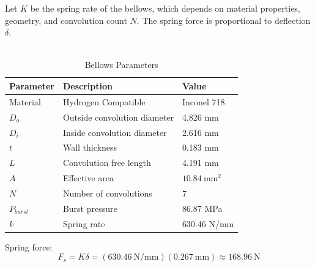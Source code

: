 \documentclass[12pt, letterpaper]{report}%
\begin{document}
            Let $K$ be the spring rate of the bellows, which depends on material properties, geometry, and convolution count $N$.
            The spring force is proportional to deflection $\delta$.
            \\~\\

            \begin{table}[H]
                \centering
                \caption{Bellows Parameters}
                \label{tab:bellows_parameters}
                \begin{tabularx}{\textwidth}{l X l}
                    \toprule
                    \textbf{Parameter} & \textbf{Description} & \textbf{Value} \\
                    \midrule
                    Material &
                    Hydrogen Compatible &
                    Inconel 718
                        \\\addlinespace
                    $D_o$ &
                    Outside convolution diameter &
                    4.826 mm
                    \\\addlinespace
                    $D_i$ &
                    Inside convolution diameter &
                    2.616 mm
                    \\\addlinespace
                    $t$ &
                    Wall thickness &
                    0.183 mm
                    \\\addlinespace
                    $L$ &
                    Convolution free length &
                    4.191 mm
                    \\\addlinespace
                    $A$ &
                    Effective area &
                    $10.84 \ \text{mm}^2$
                        \\\addlinespace
                    $N$ &
                    Number of convolutions &
                    7
                    \\\addlinespace
                    $P_{burst}$ &
                    Burst pressure &
                    86.87 MPa
                    \\\addlinespace
                    $k$ &
                    Spring rate &
                    630.46 N/mm
                    \\\bottomrule
                \end{tabularx}
            \end{table}

            Spring force:
            \begin{equation}
            F_s = K \delta = (630.46 \ \text{N/mm})(0.267 \ \text{mm}) \approx 168.96 \ \text{N}
            \label{force_spring}    
            \end{equation}
\end{document}
